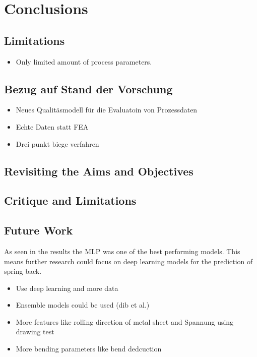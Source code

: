 \chapter{Conclusions}


\section{Limitations}

\begin{itemize}
    \item Only limited amount of process parameters.
\end{itemize}


\section{Bezug auf Stand der Vorschung}

\begin{itemize}
    \item Neues Qualitäsmodell für die Evaluatoin von Prozessdaten
    \item Echte Daten statt FEA
    \item Drei punkt biege verfahren
\end{itemize}


\section{Revisiting the Aims and Objectives}


\section{Critique and Limitations}


\section{Future Work}\label{sec:future-work}

As seen in the results the \ac{MLP} was one of the best performing models.
This means further research could focus on deep learning models for the prediction of
spring back.

\begin{itemize}
    \item Use deep learning and more data
    \item Ensemble models could be used (dib et al.)
    \item More features like rolling direction of metal sheet and Spannung using
    drawing test
    \item More bending parameters like bend dedcuction
\end{itemize}


